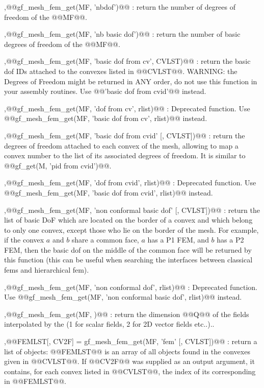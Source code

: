 \begin{cmddescription}
  \sep{@@gf\_mesh\_fem\_get(MF, 'nbdof')@@} : return the number of degrees
  of freedom of the \tmf @@MF@@.

  \sep{@@gf\_mesh\_fem\_get(MF, 'nb basic dof')@@} : return the number of
  basic degrees of freedom of the \tmf @@MF@@.

  \sep{@@gf\_mesh\_fem\_get(MF, 'basic dof from cv', CVLST)@@} :
   return the basic dof IDs attached to
  the convexes listed in @@CVLST@@. WARNING: the Degrees of Freedom
  might be returned in ANY order, do not use this function in your
  assembly routines. Use @@'basic dof from cvid'@@ instead.

  \sep{@@gf\_mesh\_fem\_get(MF, 'dof from cv', rlist)@@} : Deprecated
  function. Use @@gf\_mesh\_fem\_get(MF, 'basic dof from cv', rlist)@@ instead.
  
  \sep{@@gf\_mesh\_fem\_get(MF, 'basic dof from cvid' [, CVLST])}@@ : return
  the degrees of freedom attached to each convex of the mesh, allowing
  to map a convex number to the list of its associated degrees of
  freedom. It is similar to @@gf\mesh\_get(M, 'pid from cvid')@@.

  \sep{@@gf\_mesh\_fem\_get(MF, 'dof from cvid', rlist)@@} : Deprecated
  function. Use @@gf\_mesh\_fem\_get(MF, 'basic dof from cvid', rlist)@@ instead.

  \sep{@@gf\_mesh\_fem\_get(MF, 'non conformal basic dof' [, CVLST])@@} :
  return the list of basic DoF which are located on the border of a convex
  and which belong to only one convex, except those who lie on the
  border of the mesh. For example, if the convex $a$ and $b$ share a
  common face, $a$ has a P1 FEM, and $b$ has a P2 FEM, then the basic dof on
  the middle of the common face will be returned by this function
  (this can be useful when searching the interfaces between classical
  fems and hierarchical fem).

  \sep{@@gf\_mesh\_fem\_get(MF, 'non conformal dof', rlist)@@} : Deprecated
  function. Use @@gf\_mesh\_fem\_get(MF, 'non conformal basic dof', rlist)@@ instead.

  \sep{@@gf\_mesh\_fem\_get(MF, )@@} : return the
  dimension @@Q@@ of the fields interpolated by the \tmf (1 for scalar
  fields, 2 for 2D vector fields etc..)..
  
  \sep{@@FEMLST[, CV2F] = gf\_mesh\_fem\_get(MF, 'fem' [, \tivec
    CVLST])@@} :  return a list of \tfem objects:
  @@FEMLST@@ is an array of all \tfem objects found in the convexes
  given in @@CVLST@@. If @@CV2F@@ was supplied as an output argument,
  it contains, for each convex listed in @@CVLST@@, the index of its
  corresponding \tfem in @@FEMLST@@.


\end{cmddescription}
